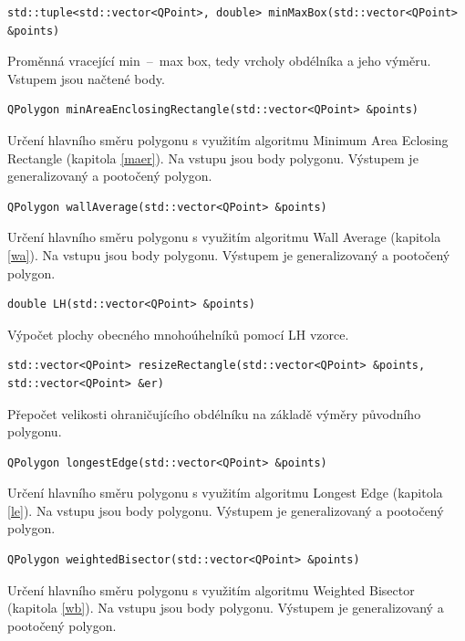 \documentclass[a4paper, 12pt, oneside, titlepage]{article} %
\begin{document}
\begin{verbatim}
std::tuple<std::vector<QPoint>, double> minMaxBox(std::vector<QPoint> &points)
\end{verbatim}
Proměnná vracející min~--~max box, tedy vrcholy obdélníka a jeho výměru. Vstupem jsou načtené body.\\

\begin{verbatim}
QPolygon minAreaEnclosingRectangle(std::vector<QPoint> &points)
\end{verbatim}
Určení hlavního směru polygonu s využitím algoritmu Minimum Area Eclosing Rectangle (kapitola \ref{maer}). Na vstupu jsou body polygonu. Výstupem je generalizovaný a pootočený polygon.\\

\begin{verbatim}
QPolygon wallAverage(std::vector<QPoint> &points)
\end{verbatim}
Určení hlavního směru polygonu s využitím algoritmu Wall Average (kapitola \ref{wa}). Na vstupu jsou body polygonu. Výstupem je generalizovaný a pootočený polygon.\\

\begin{verbatim}
double LH(std::vector<QPoint> &points)
\end{verbatim}
Výpočet plochy obecného mnohoúhelníků pomocí LH vzorce.\\ 

\begin{verbatim}
std::vector<QPoint> resizeRectangle(std::vector<QPoint> &points, std::vector<QPoint> &er)
\end{verbatim}
Přepočet velikosti ohraničujícího obdélníku na základě výměry původního polygonu.\\

\begin{verbatim}
QPolygon longestEdge(std::vector<QPoint> &points)
\end{verbatim}
Určení hlavního směru polygonu s využitím algoritmu Longest Edge (kapitola \ref{le}). Na vstupu jsou body polygonu. Výstupem je generalizovaný a pootočený polygon.\\

\begin{verbatim}
QPolygon weightedBisector(std::vector<QPoint> &points)
\end{verbatim}
Určení hlavního směru polygonu s využitím algoritmu Weighted Bisector (kapitola \ref{wb}). Na vstupu jsou body polygonu. Výstupem je generalizovaný a pootočený polygon.\\
\end{document}
